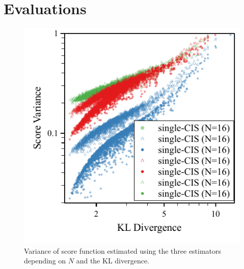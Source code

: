 

\vspace{-0.05in}
\section{Evaluations}\label{section:eval}

\begin{figure}[t]
\centering
\includegraphics[scale=0.8]{figures/simulation_02.pdf}
\caption{Variance of score function estimated using the three estimators depending on \(N\) and the KL divergence.}\label{fig:simulation}
\end{figure}
%
